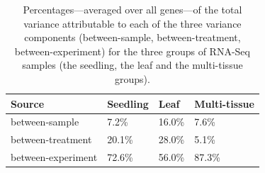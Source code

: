 \documentclass[letterpaper,12pt]{article}
\begin{document}
	\begin{center} 
		\begin{table}[!ht] 
			\centering 
			\caption[Percentages---averaged over all genes---of the total
			variance attributable to each of the three variance components]{Percentages---averaged 
				over all genes---of the total
				variance attributable to each of the three variance components
				(between-sample, between-treatment, between-experiment) for the three
				groups of RNA-Seq samples (the seedling, the leaf and the
				multi-tissue groups). %
			} 
			\label{table:percentageofvariation}
			
			\begin{tabular}{lp{3cm}p{2.5cm}p{3cm}}\hline
				Source & Seedling & Leaf & Multi-tissue \\  \hline
				between-sample & 7.2\% & 16.0\% & 7.6\% \\ 
				between-treatment & 20.1\% & 28.0\% & 5.1\% \\ 
				between-experiment & 72.6\% & 56.0\% & 87.3\% \\ \hline
			\end{tabular} \end{table} \end{center}
			
\end{document}
